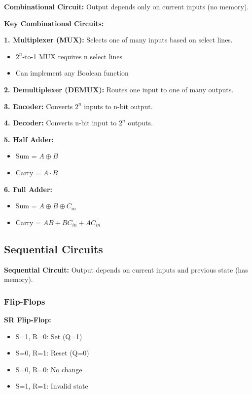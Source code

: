 \documentclass[11pt,a4paper]{article}
\begin{document}
\begin{defbox}
\textbf{Combinational Circuit:} Output depends only on current inputs (no memory).
\end{defbox}

\textbf{Key Combinational Circuits:}

\textbf{1. Multiplexer (MUX):} Selects one of many inputs based on select lines.
\begin{itemize}
    \item $2^n$-to-1 MUX requires n select lines
    \item Can implement any Boolean function
\end{itemize}

\textbf{2. Demultiplexer (DEMUX):} Routes one input to one of many outputs.

\textbf{3. Encoder:} Converts $2^n$ inputs to n-bit output.

\textbf{4. Decoder:} Converts n-bit input to $2^n$ outputs.

\textbf{5. Half Adder:}
\begin{itemize}
    \item Sum = $A \oplus B$
    \item Carry = $A \cdot B$
\end{itemize}

\textbf{6. Full Adder:}
\begin{itemize}
    \item Sum = $A \oplus B \oplus C_{in}$
    \item Carry = $AB + BC_{in} + AC_{in}$
\end{itemize}

\subsection{Sequential Circuits}

\begin{defbox}
\textbf{Sequential Circuit:} Output depends on current inputs and previous state (has memory).
\end{defbox}

\subsubsection{Flip-Flops}

\textbf{SR Flip-Flop:}
\begin{itemize}
    \item S=1, R=0: Set (Q=1)
    \item S=0, R=1: Reset (Q=0)
    \item S=0, R=0: No change
    \item S=1, R=1: Invalid state
\end{itemize}
\end{document}
